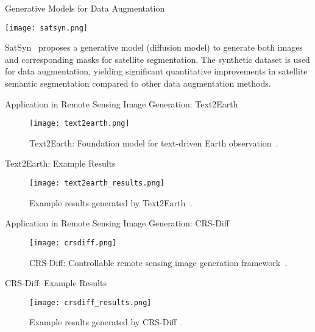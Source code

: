   
\begin{refsection}
\begin{frame}{Generative Models for Data Augmentation}
  \begin{minipage}{0.7\linewidth}
    \texttt{[image: satsyn.png]}
  \end{minipage}%
  \hfill
  \begin{minipage}{0.3\linewidth}
    \scriptsize
    SatSyn~\parencite{tokerSatSynthAugmentingImageMask2024} proposes a generative model (diffusion model) to generate both images and corresponding masks for satellite segmentation. The synthetic dataset is used for data augmentation, yielding significant quantitative improvements in satellite semantic segmentation compared to other data augmentation methods.
  \end{minipage}
  \bottomleftrefs
\end{frame}
\end{refsection}

\begin{refsection}
\begin{frame}{Application in Remote Sensing Image Generation: Text2Earth}
  \begin{figure}
    \centering
    \texttt{[image: text2earth.png]}
    \caption[]{\scriptsize Text2Earth: Foundation model for text-driven Earth observation~\parencite{text2earth2025}.}
  \end{figure}
  \bottomleftrefs
\end{frame}
\end{refsection}

\begin{refsection}
\begin{frame}{Text2Earth: Example Results}
  \begin{figure}
    \centering
    \texttt{[image: text2earth\_results.png]}
    \caption[]{\scriptsize Example results generated by Text2Earth~\parencite{text2earth2025}.}
  \end{figure}
  \bottomleftrefs
\end{frame}
\end{refsection}

\begin{refsection}
\begin{frame}{Application in Remote Sensing Image Generation: CRS-Diff}
\begin{figure}
  \centering
  \texttt{[image: crsdiff.png]}
  \caption[]{\scriptsize CRS-Diff: Controllable remote sensing image generation framework~\parencite{tang2024crsdiff}.}
\end{figure}
\bottomleftrefs
\end{frame}
\end{refsection}

\begin{refsection}
\begin{frame}{CRS-Diff: Example Results}
\begin{figure}
  \centering
  \texttt{[image: crsdiff\_results.png]}
  \caption[]{\scriptsize Example results generated by CRS-Diff~\parencite{tang2024crsdiff}.}
\end{figure}
\bottomleftrefs
\end{frame}
\end{refsection}